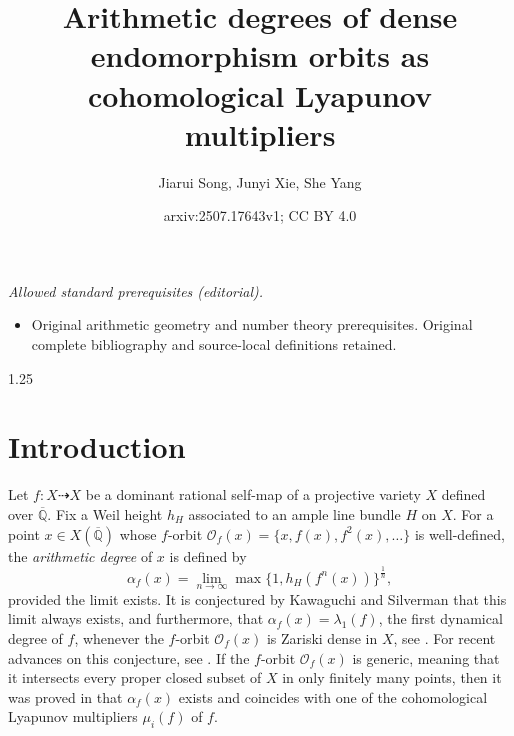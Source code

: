 \documentclass[12pt]{amsart}
\title{Arithmetic degrees of dense endomorphism orbits as cohomological Lyapunov multipliers}
\author{Jiarui Song, Junyi Xie, She Yang}
\date{arxiv:2507.17643v1; CC BY 4.0}
\newcommand\mO{\mathcal{O}}
\newcommand{\mb}[1]{\mathbb{#1}}
\newcommand{\ov}{\overline}
\newcommand\ra{\rightarrow}
\begin{document}
\maketitle
\noindent\textit{Allowed standard prerequisites (editorial).}\begin{itemize}
\item Original arithmetic geometry and number theory prerequisites. Original complete bibliography and source-local definitions retained.
\end{itemize}\medskip
\begin{spacing}{1.25}

\newtheorem{theorem}{Theorem}[section]
\newtheorem{lemma}[theorem]{Lemma}
\newtheorem{proposition}[theorem]{Proposition}
\newtheorem{corollary}[theorem]{Corollary}
\newtheorem{conjecture}[theorem]{Conjecture}
\newtheorem{conv}[theorem]{Convention}
\newtheorem{ques}[theorem]{Question} 
\newtheorem{prb}[theorem]{Problem}  

	
	\theoremstyle{definition}
	\newtheorem{definition}[theorem]{Definition}
	\newtheorem{example}[theorem]{Example}
	
	\theoremstyle{remark}
	\newtheorem{remark}[theorem]{Remark}
	
	


    

\section{Introduction}\label{Sec_intro}

Let $f:X\dashrightarrow X$ be a dominant rational self-map of a projective variety $X$ defined over $\overline{\mb{Q}}$. Fix a Weil height $h_H$ associated to an ample line bundle $H$ on $X$. For a point $x\in X(\ov{\mb{Q}})$ whose $f$-orbit $\mO_f(x)=\{x,f(x),f^2(x),\ldots\}$ is well-defined, the \emph{arithmetic degree} of $x$ is defined by 
\[\alpha_f(x)=\lim_{n\ra\infty}\max\{1, h_H(f^n(x))\}^{\frac{1}{n}},\]
provided the limit exists. It is conjectured by Kawaguchi and Silverman that this limit always exists, and furthermore, that $\alpha_f(x)=\lambda_1(f)$, the first dynamical degree of $f$, whenever the $f$-orbit $\mO_f(x)$ is Zariski dense in $X$, see \cite{KS16C}. For recent advances on this conjecture, see \cite{Mat22}. If the $f$-orbit $\mO_f(x)$ is generic, meaning that it intersects every proper closed subset of $X$ in only finitely many points, then it was proved in \cite[Theorem 2.2]{Mat25} that $\alpha_f(x)$ exists and coincides with one of the cohomological Lyapunov multipliers $\mu_i(f)$ of $f$.


\end{spacing}
\end{document}
